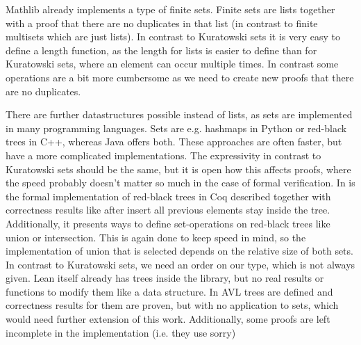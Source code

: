 \documentclass{article}
\begin{document}
Mathlib already implements a type of finite sets.\cite{leanfinset} Finite sets are lists together with a proof that there are no duplicates in that list (in contrast to finite multisets which are just lists). In contrast to Kuratowski sets it is very easy to define a length function, as the length for lists is easier to define than for Kuratowski sets, where an element can occur multiple times. In contrast some operations are a bit more cumbersome as we need to create new proofs that there are no duplicates.

There are further datastructures possible instead of lists, as sets are implemented in many programming languages. Sets are e.g. hashmaps in Python or red-black trees in C++, whereas Java offers both.
These approaches are often faster, but have a more complicated implementations. The expressivity in contrast to Kuratowski sets should be the same, but it is open how this affects proofs, where the speed probably doesn't matter so much in the case of formal verification.
In \cite{redblacktree} is the formal implementation of red-black trees in Coq described together with correctness results like after insert all previous elements stay inside the tree. Additionally, it presents ways to define set-operations on red-black trees like union or intersection. This is again done to keep speed in mind, so the implementation of union that is selected depends on the relative size of both sets. In contrast to Kuratowski sets, we need an order on our type, which is not always given.
Lean itself already has trees inside the library, but no real results or functions to modify them like a data structure. In \cite{avl} AVL trees are defined and correctness results for them are proven, but with no application to sets, which would need further extension of this work. Additionally, some proofs are left incomplete in the implementation (i.e. they use sorry)
\end{document}
